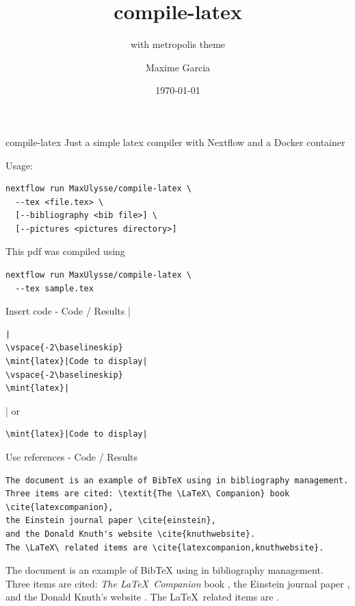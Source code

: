\documentclass{beamer}
\author{Maxime Garcia}
\date{\today}
\institute{MaxUlysse}
\subtitle{with metropolis theme}
\title{compile-latex}
\begin{document}
\maketitle

\begin{frame}[fragile]{compile-latex}
  Just a simple latex compiler with Nextflow and a Docker container

  Usage:
  \begin{verbatim}
nextflow run MaxUlysse/compile-latex \
  --tex <file.tex> \
  [--bibliography <bib file>] \
  [--pictures <pictures directory>]
  \end{verbatim}
  This pdf was compiled using
  \begin{verbatim}
nextflow run MaxUlysse/compile-latex \
  --tex sample.tex
  \end{verbatim}
\end{frame}

\begin{frame}[fragile]{Insert code - Code / Results}
\tiny
\mint{latex}|\begin{verbatim}|
\vspace{-2\baselineskip}
\mint{latex}|Code to display|
\vspace{-2\baselineskip}
\mint{latex}|\end{verbatim}|
or
\begin{verbatim}
\mint{latex}|Code to display|
\end{verbatim}
\end{frame}

\begin{frame}[fragile]{Use references - Code / Results}
\begin{verbatim}
The document is an example of BibTeX using in bibliography management.
Three items are cited: \textit{The \LaTeX\ Companion} book \cite{latexcompanion},
the Einstein journal paper \cite{einstein},
and the Donald Knuth's website \cite{knuthwebsite}.
The \LaTeX\ related items are \cite{latexcompanion,knuthwebsite}.
\end{verbatim}
The document is an example of BibTeX using in bibliography management.
Three items are cited: \textit{The \LaTeX\ Companion} book \cite{latexcompanion},
the Einstein journal paper \cite{einstein},
and the Donald Knuth's website \cite{knuthwebsite}.
The \LaTeX\ related items are \cite{latexcompanion,knuthwebsite}.
\end{frame}
\end{document}
